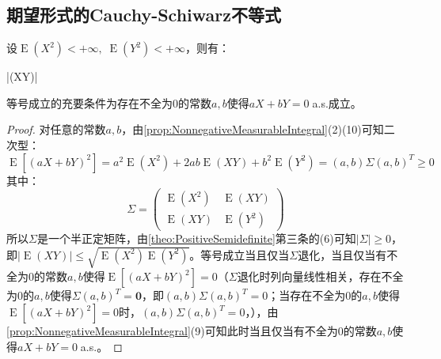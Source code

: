 \subsection{期望形式的Cauchy-Schiwarz不等式}
\begin{theorem}
	设$\operatorname{E}(X^2)<+\infty,\;\operatorname{E}(Y^2)<+\infty$，则有：
	\begin{inequality*}\label{ineq:cauchy-schiwarz-expectations}
		|(XY)|\leqslant{}
	\end{inequality*}
	等号成立的充要条件为存在不全为$0$的常数$a,b$使得$aX+bY=0\;$a.s.成立。
\end{theorem}
\begin{proof}
	对任意的常数$a,b$，由\cref{prop:NonnegativeMeasurableIntegral}(2)(10)可知二次型：
	\begin{equation*}
		\operatorname{E}[(aX+bY)^2]=a^2\operatorname{E}(X^2)+2ab\operatorname{E}(XY)+b^2\operatorname{E}(Y^2)=(a,b)\Sigma(a,b)^T\geqslant0
	\end{equation*}
	其中：
	\begin{equation*}
		\Sigma=
		\begin{pmatrix}
			\operatorname{E}(X^2) & \operatorname{E}(XY) \\
			\operatorname{E}(XY) & \operatorname{E}(Y^2)
		\end{pmatrix}
	\end{equation*}
	所以$\Sigma$是一个半正定矩阵，由\cref{theo:PositiveSemidefinite}第三条的(6)可知$|\Sigma|\geqslant0$，即$|\operatorname{E}(XY)|\leqslant\sqrt{\operatorname{E}(X^2)\operatorname{E}(Y^2)}$。等号成立当且仅当$\Sigma$退化，当且仅当有不全为$0$的常数$a,b$使得$\operatorname{E}[(aX+bY)^2]=0$（$\Sigma$退化时列向量线性相关，存在不全为$0$的$a,b$使得$\Sigma(a,b)^T=\mathbf{0}$，即$(a,b)\Sigma(a,b)^T=0$；当存在不全为$0$的$a,b$使得$\operatorname{E}[(aX+bY)^2]=0$时，$(a,b)\Sigma(a,b)^T=0$，），由\cref{prop:NonnegativeMeasurableIntegral}(9)可知此时当且仅当有不全为$0$的常数$a,b$使得$aX+bY=0\;$a.s.。
\end{proof}

